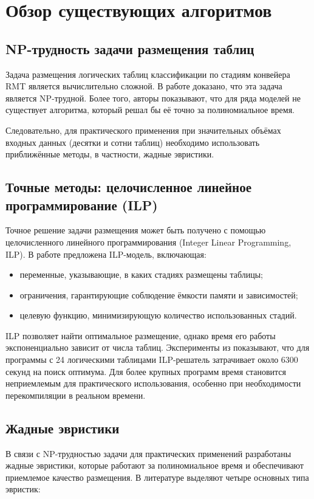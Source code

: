 \section{Обзор существующих алгоритмов}

\subsection{NP-трудность задачи размещения таблиц}
Задача размещения логических таблиц классификации по стадиям конвейера RMT является вычислительно сложной. В работе \cite{vass2020compiling} доказано, что эта задача является NP-трудной. Более того, авторы показывают, что для ряда моделей не существует алгоритма, который решал бы её точно за полиномиальное время. 

Следовательно, для практического применения при значительных объёмах входных данных (десятки и сотни таблиц) необходимо использовать приближённые методы, в частности, жадные эвристики.

\subsection{Точные методы: целочисленное линейное программирование (ILP)}
Точное решение задачи размещения может быть получено с помощью целочисленного линейного программирования (Integer Linear Programming, ILP). В работе \cite{jose2015compiling} предложена ILP-модель, включающая:
\begin{itemize}
	\item переменные, указывающие, в каких стадиях размещены таблицы;
	\item ограничения, гарантирующие соблюдение ёмкости памяти и зависимостей;
	\item целевую функцию, минимизирующую количество использованных стадий.
\end{itemize}
ILP позволяет найти оптимальное размещение, однако время его работы экспоненциально зависит от числа таблиц. Эксперименты из \cite{jose2015compiling} показывают, что для программы с 24 логическими таблицами  ILP-решатель затрачивает около 6300 секунд на поиск оптимума. Для более крупных программ время становится неприемлемым для практического использования, особенно при необходимости перекомпиляции в реальном времени.

\subsection{Жадные эвристики}
В связи с NP-трудностью задачи для практических применений разработаны жадные эвристики, которые работают за полиномиальное время и обеспечивают приемлемое качество размещения. В литературе \cite{jose2015compiling} выделяют четыре основных типа эвристик:


